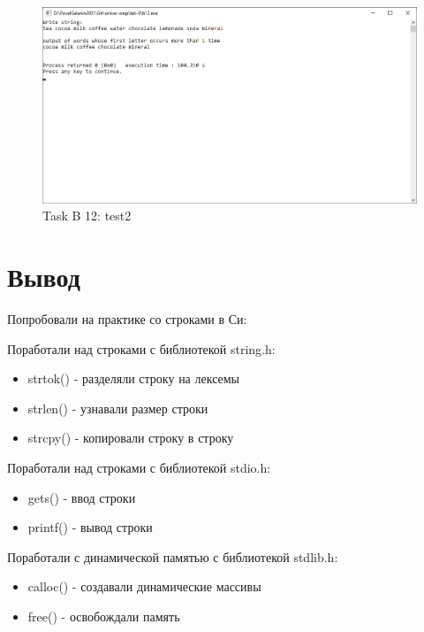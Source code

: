 \documentclass[12pt,a4paper]{article}
\begin{document}
\begin{figure}[ht]
  \centering
  \includegraphics[width=16cm]{imgs/b12-test2.png}
  \caption{Task B 12: test2}
  \label{fig:b12-test2}
\end{figure}



\clearpage

\section{Вывод}

Попробовали на практике со строками в Си:

Поработали над строками с библиотекой string.h:

\begin{itemize}
    \item strtok() - разделяли строку на лексемы
    \item strlen() - узнавали размер строки
    \item strcpy() - копировали строку в строку
\end{itemize}

Поработали над строками с библиотекой stdio.h:

\begin{itemize}
    \item gets() - ввод строки
    \item printf() - вывод строки
\end{itemize}

Поработали с динамической памятью с библиотекой stdlib.h:

\begin{itemize}
    \item calloc() - создавали динамические массивы
    \item free() - освобождали память
\end{itemize}
\end{document}
